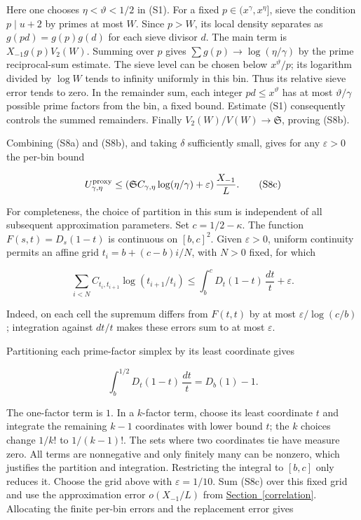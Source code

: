 Here one chooses \(\eta<\vartheta<1/2\) in (S1). For a fixed
\(p\in(x^\gamma,x^\eta]\), sieve the condition \(p\mid u+2\) by primes
at most \(W\). Since \(p>W\), its local density separates as
\(g(pd)=g(p)g(d)\) for each sieve divisor \(d\). The main term is
\(X_{-1}g(p)V_2(W)\). Summing over \(p\) gives
\(\sum g(p)\to\log(\eta/\gamma)\) by the prime reciprocal-sum estimate.
The sieve level can be chosen below \(x^\vartheta/p\); its logarithm
divided by \(\log W\) tends to infinity uniformly in this bin. Thus its
relative sieve error tends to zero. In the remainder sum, each integer
\(pd\le x^\vartheta\) has at most \(\vartheta/\gamma\) possible prime
factors from the bin, a fixed bound. Estimate (S1) consequently controls
the summed remainders. Finally \(V_2(W)/V(W)\to\mathfrak S\), proving
(S8b).

Combining (S8a) and (S8b), and taking \(\delta\) sufficiently small,
gives for any \(\varepsilon>0\) the per-bin bound

\[
U^{\rm proxy}_{\gamma,\eta}
\le\left(\mathfrak S C_{\gamma,\eta}\log(\eta/\gamma)
          +\varepsilon\right)\frac{X_{-1}}L. \tag{S8c}
\]

For completeness, the choice of partition in this sum is independent of
all subsequent approximation parameters. Set \(c=1/2-\kappa\). The
function \(F(s,t)=D_s(1-t)\) is continuous on \([b,c]^2\). Given
\(\varepsilon>0\), uniform continuity permits an affine grid
\(t_i=b+(c-b)i/N\), with \(N>0\) fixed, for which

\[
\sum_{i<N}C_{t_i,t_{i+1}}\log(t_{i+1}/t_i)
\le\int_b^c D_t(1-t)\,\frac{dt}{t}+\varepsilon.
\]

Indeed, on each cell the supremum differs from \(F(t,t)\) by at most
\(\varepsilon/\log(c/b)\); integration against \(dt/t\) makes these
errors sum to at most \(\varepsilon\).

Partitioning each prime-factor simplex by its least coordinate gives

\[
\int_b^{1/2}D_t(1-t)\,\frac{dt}{t}=D_b(1)-1.
\]

The one-factor term is \(1\). In a \(k\)-factor term, choose its least
coordinate \(t\) and integrate the remaining \(k-1\) coordinates with
lower bound \(t\); the \(k\) choices change \(1/k!\) to \(1/(k-1)!\).
The sets where two coordinates tie have measure zero. All terms are
nonnegative and only finitely many can be nonzero, which justifies the
partition and integration. Restricting the integral to \([b,c]\) only
reduces it. Choose the grid above with \(\varepsilon=1/10\). Sum (S8c)
over this fixed grid and use the approximation error \(o(X_{-1}/L)\)
from \protect\hyperlink{correlation}{Section~\ref{correlation}}.
Allocating the finite per-bin errors and the replacement error gives

